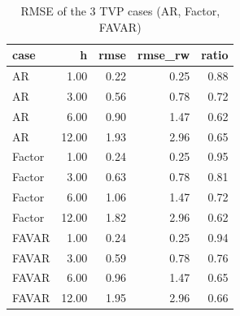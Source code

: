 \begin{table}[ht]
\centering
\begin{tabular}{lrrrr}
  \hline
case & h & rmse & rmse\_rw & ratio \\ 
  \hline
AR & 1.00 & 0.22 & 0.25 & 0.88 \\ 
  AR & 3.00 & 0.56 & 0.78 & 0.72 \\ 
  AR & 6.00 & 0.90 & 1.47 & 0.62 \\ 
  AR & 12.00 & 1.93 & 2.96 & 0.65 \\ 
  Factor & 1.00 & 0.24 & 0.25 & 0.95 \\ 
  Factor & 3.00 & 0.63 & 0.78 & 0.81 \\ 
  Factor & 6.00 & 1.06 & 1.47 & 0.72 \\ 
  Factor & 12.00 & 1.82 & 2.96 & 0.62 \\ 
  FAVAR & 1.00 & 0.24 & 0.25 & 0.94 \\ 
  FAVAR & 3.00 & 0.59 & 0.78 & 0.76 \\ 
  FAVAR & 6.00 & 0.96 & 1.47 & 0.65 \\ 
  FAVAR & 12.00 & 1.95 & 2.96 & 0.66 \\ 
   \hline
\end{tabular}
\caption{RMSE of the 3 TVP cases (AR, Factor, FAVAR)} 
\label{tab:tvp_3cases}
\end{table}
